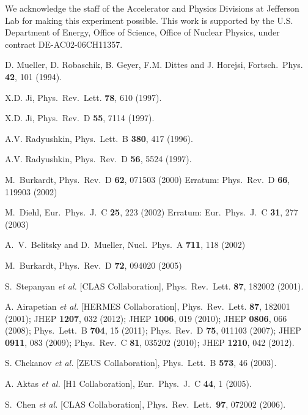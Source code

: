 \documentclass[twocolumn,nofootinbib,showpacs,prl,superscriptaddress,secnumarabic,amssymb,nobibnotes,aps,floatfix]{revtex4}
\begin{document}
We acknowledge the staff of the Accelerator and Physics Divisions at Jefferson 
Lab for making this experiment possible. This work is supported by the U.S.  
Department of Energy, Office of Science, Office of Nuclear Physics, under 
contract DE-AC02-06CH11357.

\begin{thebibliography}{99}
D. Mueller, D. Robaschik, B. Geyer, F.M. Dittes and J. Horejsi,
Fortsch.\ Phys. {\bf 42}, 101 (1994).
  
X.D. Ji,
Phys.\ Rev.\ Lett. {\bf 78}, 610 (1997).

X.D. Ji,
Phys.\ Rev.\ D {\bf 55}, 7114 (1997).

A.V. Radyushkin,
Phys.\ Lett.\  B {\bf 380}, 417 (1996).

A.V. Radyushkin,
Phys.\ Rev.\ D {\bf 56}, 5524 (1997).

  M.~Burkardt,
  Phys.\ Rev.\ D {\bf 62}, 071503 (2000)
  Erratum: Phys.\ Rev.\ D {\bf 66}, 119903 (2002)

  M.~Diehl,
  Eur.\ Phys.\ J.\ C {\bf 25}, 223 (2002)
  Erratum: Eur.\ Phys.\ J.\ C {\bf 31}, 277 (2003)
 
  A.~V.~Belitsky and D.~Mueller,
  Nucl.\ Phys.\ A {\bf 711}, 118 (2002)

  M.~Burkardt,
  Phys.\ Rev.\ D {\bf 72}, 094020 (2005)

S.~Stepanyan {\it et al.} [CLAS Collaboration],
Phys.\ Rev.\ Lett. {\bf 87}, 182002 (2001).

A. Airapetian {\it et al.} [HERMES Collaboration],
Phys.\ Rev.\ Lett. {\bf 87}, 182001 (2001);
JHEP {\bf 1207}, 032 (2012);
JHEP {\bf 1006}, 019 (2010);
JHEP {\bf 0806}, 066 (2008);
Phys.\ Lett.\ B {\bf 704}, 15 (2011);
Phys.\ Rev.\  D {\bf 75}, 011103 (2007);
JHEP {\bf 0911}, 083 (2009);
Phys.\ Rev.\ C {\bf 81}, 035202 (2010);
JHEP {\bf 1210}, 042 (2012).

S. Chekanov {\it et al.} [ZEUS Collaboration],
Phys.\ Lett.\  B {\bf 573}, 46 (2003).

A. Aktas {\it et al.} [H1 Collaboration],
Eur.\ Phys.\ J.\ C {\bf 44}, 1 (2005).

S.~Chen {\it et al.} [CLAS Collaboration],
Phys.\ Rev.\ Lett.\ {\bf 97}, 072002 (2006).


\end{thebibliography}
\end{document}
